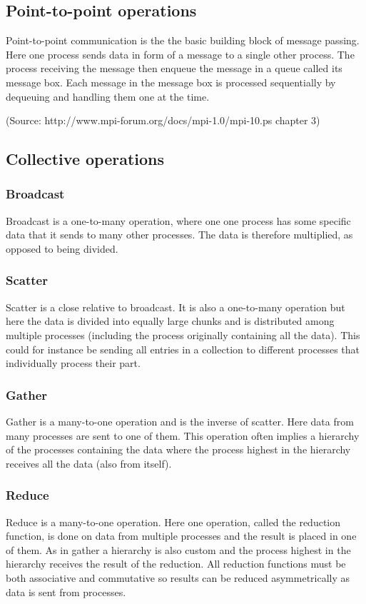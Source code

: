 \subsection{Point-to-point operations}
Point-to-point communication is the the basic building block of message passing. Here one process sends data in form of a message to a single other process. The process receiving the message then enqueue the message in a queue called its message box. Each message in the message box is processed sequentially by dequeuing and handling them one at the time.

(Source: http://www.mpi-forum.org/docs/mpi-1.0/mpi-10.ps chapter 3)

\subsection{Collective operations}

\subsubsection{Broadcast}
Broadcast is a one-to-many operation, where one one process has some specific data that it sends to many other processes. The data is therefore multiplied, as opposed to being divided.

\subsubsection{Scatter}
Scatter is a close relative to broadcast. It is also a one-to-many operation but here the data is divided into equally large chunks and is distributed among multiple processes (including the process originally containing all the data). This could for instance be sending all entries in a collection to different processes that individually process their part.

\subsubsection{Gather}
Gather is a many-to-one operation and is the inverse of scatter. Here data from many processes are sent to one of them. This operation often implies a hierarchy of the processes containing the data where the process highest in the hierarchy receives all the data (also from itself).

\subsubsection{Reduce}
Reduce is a many-to-one operation. Here one operation, called the reduction function, is done on data from multiple processes and the result is placed in one of them. As in gather a hierarchy is also custom and the process highest in the hierarchy receives the result of the reduction. All reduction functions must be both associative and commutative so results can be reduced asymmetrically as data is sent from processes.

